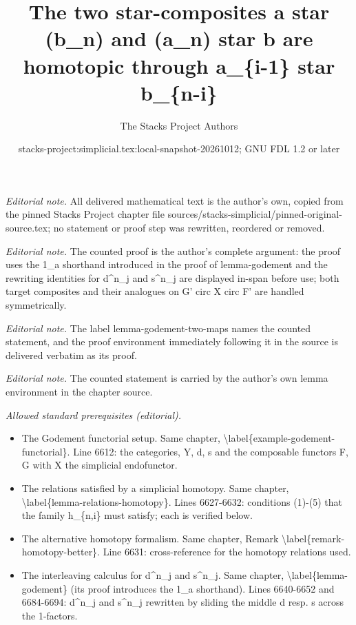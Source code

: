 \documentclass{stacks-project}
\title{The two star-composites a star (b\_n) and (a\_n) star b are homotopic through a\_\{i-1\} star b\_\{n-i\}}
\author{The Stacks Project Authors}
\date{stacks-project:simplicial.tex:local-snapshot-20261012; GNU FDL 1.2 or later}
\theoremstyle{plain}
\theoremstyle{definition}
\theoremstyle{remark}
\numberwithin{equation}{subsection}
\begin{document}
\maketitle
\noindent\textit{Editorial note.} All delivered mathematical text is the author's own, copied from the pinned Stacks Project chapter file sources/stacks-simplicial/pinned-original-source.tex; no statement or proof step was rewritten, reordered or removed.\par\medskip
\noindent\textit{Editorial note.} The counted proof is the author's complete argument: the proof uses the 1\_a shorthand introduced in the proof of lemma-godement and the rewriting identities for d\textasciicircum{}n\_j and s\textasciicircum{}n\_j are displayed in-span before use; both target composites and their analogues on G' circ X circ F' are handled symmetrically.\par\medskip
\noindent\textit{Editorial note.} The label lemma-godement-two-maps names the counted statement, and the proof environment immediately following it in the source is delivered verbatim as its proof.\par\medskip
\noindent\textit{Editorial note.} The counted statement is carried by the author's own lemma environment in the chapter source.\par\medskip
\noindent\textit{Allowed standard prerequisites (editorial).}\begin{itemize}
\item The Godement functorial setup. Same chapter, \textbackslash{}label\{example-godement-functorial\}. Line 6612: the categories, Y, d, s and the composable functors F, G with X the simplicial endofunctor.
\item The relations satisfied by a simplicial homotopy. Same chapter, \textbackslash{}label\{lemma-relations-homotopy\}. Lines 6627-6632: conditions (1)-(5) that the family h\_\{n,i\} must satisfy; each is verified below.
\item The alternative homotopy formalism. Same chapter, Remark \textbackslash{}label\{remark-homotopy-better\}. Line 6631: cross-reference for the homotopy relations used.
\item The interleaving calculus for d\textasciicircum{}n\_j and s\textasciicircum{}n\_j. Same chapter, \textbackslash{}label\{lemma-godement\} (its proof introduces the 1\_a shorthand). Lines 6640-6652 and 6684-6694: d\textasciicircum{}n\_j and s\textasciicircum{}n\_j rewritten by sliding the middle d resp. s across the 1-factors.
\end{itemize}\medskip
\end{document}
